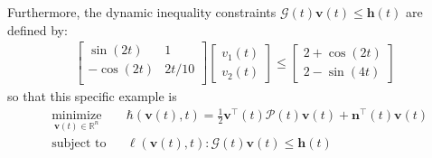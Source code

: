 \documentclass[pdflatex,sn-mathphys,Numbered]{sn-jnl}
\theoremstyle{thmstyleone}
\theoremstyle{thmstyletwo}
\theoremstyle{thmstylethree}
\begin{document}
Furthermore, the dynamic inequality constraints $\mathcal{G}(t)\bm{v}(t) \leq \bm{h}(t)$ are defined by:
\begin{equation}\label{eq:constraints}
\begin{aligned}
\begin{bmatrix}
\sin(2t) & 1 \\
-\cos(2t) & 2t/10 \\
\end{bmatrix}
\begin{bmatrix} v_1(t)  \\ v_2(t)  \end{bmatrix} \leq
\begin{bmatrix}
2 + \cos(2t) \\
2 - \sin(4t)
\end{bmatrix}
\end{aligned}
\end{equation}
so that this specific example is
\begin{equation}
\begin{aligned}
& \underset{\bm{v}(t) \in \mathbb{R}^n}{\text{minimize}} & & \hbar(\bm{v}(t), t) = \frac{1}{2} \bm{v}^\top(t) \mathcal{P}(t) \bm{v}(t) + \bm{n}^\top(t)\bm{v}(t) \\
& \text{subject to} & & \bm{\ell}(\bm{v}(t), t):\mathcal{G}(t)\bm{v}(t) \leq \bm{h}(t)
\end{aligned}
\label{eq:problem234}
\end{equation}
\end{document}
